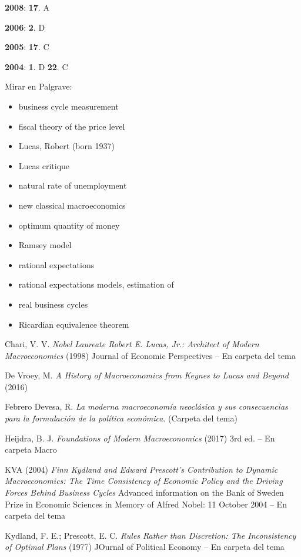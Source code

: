 \documentclass{nuevotema}
\begin{document}
\textbf{2008}: \textbf{17}. A

\textbf{2006}: \textbf{2}. D

\textbf{2005}: \textbf{17}. C

\textbf{2004}: \textbf{1}. D \textbf{22}. C

\bibliografia

Mirar en Palgrave:
\begin{itemize}
	\item business cycle measurement
	\item fiscal theory of the price level
	\item Lucas, Robert (born 1937)
	\item Lucas critique
	\item natural rate of unemployment
	\item new classical macroeconomics
	\item optimum quantity of money
	\item Ramsey model
	\item rational expectations
	\item rational expectations models, estimation of
	\item real business cycles
	\item Ricardian equivalence theorem
	
\end{itemize}

Chari, V. V. \textit{Nobel Laureate Robert E. Lucas, Jr.: Architect of Modern Macroeconomics} (1998) Journal of Economic Perspectives -- En carpeta del tema

De Vroey, M. \textit{A History of Macroeconomics from Keynes to Lucas and Beyond} (2016)

Febrero Devesa, R. \textit{La moderna macroeconomía neoclásica y sus consecuencias para la formulación de la política económica}. (Carpeta del tema)

Heijdra, B. J. \textit{Foundations of Modern Macroeconomics} (2017) 3rd ed. -- En carpeta Macro

KVA (2004) \textit{Finn Kydland and Edward Prescott's Contribution to Dynamic Macroeconomics: The Time Consistency of Economic Policy and the Driving Forces Behind Business Cycles} Advanced information on the Bank of Sweden Prize in Economic Sciences in Memory of Alfred Nobel: 11 October 2004 -- En carpeta del tema

Kydland, F. E.; Prescott, E. C. \textit{Rules Rather than Discretion: The Inconsistency of Optimal Plans} (1977) JOurnal of Political Economy -- En carpeta del tema
\end{document}
